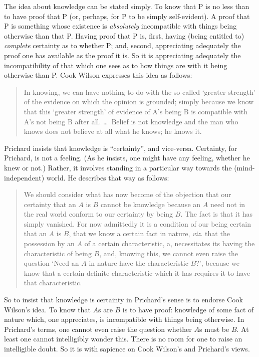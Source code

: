 The idea about knowledge can be stated simply. To know that P is no less than to have proof that P (or, perhaps, for P to be simply self-evident). A proof that P is something whose existence is \emph{absolutely} incompatible with things being otherwise than that P. Having proof that P is, first, having (being entitled to) \emph{complete} certainty as to whether P; and, second, appreciating adequately the proof one has available as the proof it is. So it is appreciating adequately the incompatibility of that which one sees as to how things are with it being otherwise than P. Cook Wilson expresses this idea as follows:
\begin{quote}
	In knowing, we can have nothing to do with the so-called `greater strength' of the evidence on which the opinion is grounded; simply because we know that this `greater strength' of evidence of A's being B is compatible with A's not being B after all. \ldots\ Belief is not knowledge and the man who knows does not believe at all what he knows; he knows it. \citep[100]{Cook-Wilson:1926sf}
\end{quote}
Prichard insists that knowledge is ``certainty'', and vice-versa. Certainty, for Prichard, is not a feeling. (As he insists, one might have any feeling, whether he knew or not.) Rather, it involves standing in a particular way towards the (mind-independent) world. He describes that way as follows:
\begin{quote}
	We should consider what has now become of the objection that our certainty that an \( A \) is \( B \) cannot be knowledge because an \( A \) need not in the real world conform to our certainty by being \( B \). The fact is that it has simply vanished. For now admittedly it is a condition of our being certain that an \( A \) is \( B \), that we know a certain fact in nature, \emph{viz}. that the possession by an \( A \) of a certain characteristic, a, necessitates its having the characteristic of being \( B \), and, knowing this, we cannot even raise the question `Need an \( A \) in nature have the characteristic \( B \)?', because we know that a certain definite characteristic which it has requires it to have that characteristic. \citep[103--104]{Prichard:1950tg}
\end{quote}
So to insist that knowledge is certainty in Prichard's sense is to endorse Cook Wilson's idea. To know that \( A \)s are \( B \) is to have proof: knowledge of some fact of nature which, one appreciates, is incompatible with things being otherwise. In Prichard's terms, one cannot even raise the question whether \( A \)s must be \( B \). At least one cannot intelligibly wonder this. There is no room for one to raise an intelligible doubt. So it is with sapience on Cook Wilson’s and Prichard's views.

